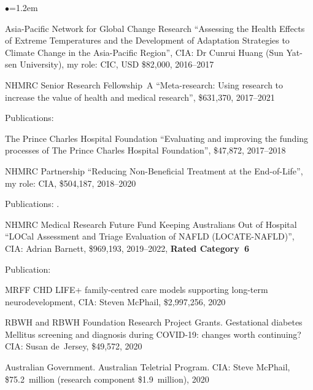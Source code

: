 \documentclass[a4paper,11pt]{article}
\renewcommand{\labelitemi}{$\bullet$}
\begin{document}
\begin{raggedright}
\begin{list}{\labelitemi}{\leftmargin=1.2em}
\item Asia-Pacific Network for Global Change Research ``Assessing the Health Effects of Extreme Temperatures and the Development of
Adaptation Strategies to Climate Change in the Asia-Pacific Region'', CIA: Dr Cunrui Huang (Sun Yat-sen University), my role: CIC, USD \$82,000, 2016--2017

\item NHMRC Senior Research Fellowship~A ``Meta-research: Using research to increase the value of health and medical research'', \$631,370, 2017--2021

   Publications: 

\item The Prince Charles Hospital Foundation ``Evaluating and improving the funding processes of The Prince Charles Hospital Foundation'', \$47,872, 2017--2018

\item NHMRC Partnership ``Reducing Non-Beneficial Treatment at the End-of-Life'', my role: CIA, \$504,187, 2018--2020

Publications: .

\item NHMRC Medical Research Future Fund Keeping Australians Out of Hospital ``LOCal Assessment and Triage Evaluation of NAFLD (LOCATE-NAFLD)'', CIA: Adrian Barnett, \$969,193, 2019--2022, \textbf{Rated Category~6}

Publication: 

\item MRFF CHD LIFE+ family-centred care models supporting long-term neurodevelopment, CIA: Steven McPhail, \$2,997,256, 2020

\item RBWH and RBWH Foundation Research Project Grants. Gestational diabetes Mellitus screening and diagnosis during COVID-19: changes worth continuing? CIA: Susan de~Jersey, \$49,572, 2020

\item Australian Government. Australian Teletrial Program. CIA: Steve McPhail, \$75.2~million (research component \$1.9~million), 2020


\end{list}
\end{raggedright}
\end{document}
